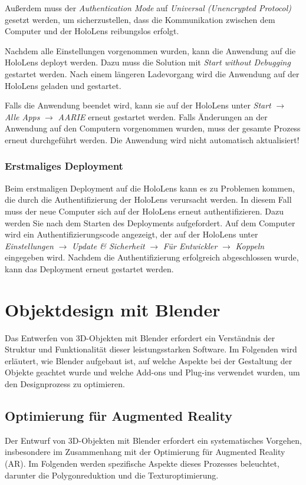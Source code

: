 Außerdem muss der \textit{Authentication Mode} auf \textit{Universal (Unencrypted Protocol)} gesetzt werden, um
sicherzustellen, dass die Kommunikation zwischen dem Computer und der HoloLens reibungslos erfolgt.

Nachdem alle Einstellungen vorgenommen wurden, kann die Anwendung auf die HoloLens deployt werden. Dazu muss die
Solution mit \textit{Start without Debugging} gestartet werden. Nach einem längeren Ladevorgang wird die Anwendung auf der
HoloLens geladen und gestartet.

Falls die Anwendung beendet wird, kann sie auf der HoloLens unter
\textit{Start} $\rightarrow$ \textit{Alle Apps} $\rightarrow$ \textit{AARIE} erneut gestartet werden.
Falls Änderungen an der Anwendung auf den Computern vorgenommen wurden, muss der gesamte Prozess erneut durchgeführt werden.
Die Anwendung wird nicht automatisch aktualisiert!

\subsubsection{Erstmaliges Deployment}
Beim erstmaligen Deployment auf die HoloLens kann es zu Problemen kommen, die durch die Authentifizierung der HoloLens
verursacht werden. In diesem Fall muss der neue Computer sich auf der HoloLens erneut authentifizieren. Dazu werden Sie nach
dem Starten des Deployments aufgefordert. Auf dem Computer wird ein Authentifizierungscode angezeigt, der auf der HoloLens unter
\textit{Einstellungen} $\rightarrow$ \textit{Update & Sicherheit} $\rightarrow$ \textit{Für Entwickler} $\rightarrow$ \textit{Koppeln}
eingegeben wird. Nachdem die Authentifizierung erfolgreich abgeschlossen wurde, kann das Deployment erneut gestartet werden.


\section{Objektdesign mit Blender} 
Das Entwerfen von 3D-Objekten mit Blender erfordert ein Verständnis der Struktur und Funktionalität dieser leistungsstarken
Software. Im Folgenden wird erläutert, wie Blender aufgebaut ist, auf welche Aspekte bei der Gestaltung der Objekte geachtet
wurde und welche Add-ons und Plug-ins verwendet wurden, um den Designprozess zu optimieren.

\subsection{Optimierung für Augmented Reality}
Der Entwurf von 3D-Objekten mit Blender erfordert ein systematisches Vorgehen, insbesondere im Zusammenhang mit der
Optimierung für Augmented Reality (AR). Im Folgenden werden spezifische Aspekte dieses Prozesses beleuchtet, darunter
die Polygonreduktion und die Texturoptimierung.

